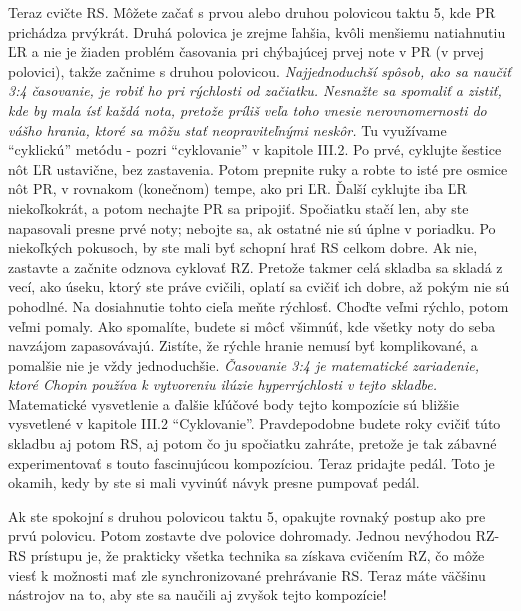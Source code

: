 Teraz cvičte RS. Môžete začať s prvou alebo druhou polovicou taktu 5, kde PR prichádza prvýkrát. Druhá polovica je zrejme ľahšia, kvôli menšiemu natiahnutiu ĽR a nie je žiaden problém časovania pri chýbajúcej prvej note v PR (v prvej polovici), takže začnime s druhou polovicou. \emph{Najjednoduchší spôsob, ako sa naučiť 3:4 časovanie, je robiť ho pri rýchlosti od začiatku. Nesnažte sa spomaliť a zistiť, kde by mala ísť každá nota, pretože príliš veľa toho vnesie nerovnomernosti do vášho hrania, ktoré sa môžu stať neopraviteľnými neskôr.} Tu využívame “cyklickú” metódu - pozri “cyklovanie” v kapitole III.2. Po prvé, cyklujte šestice nôt ĽR ustavične, bez zastavenia. Potom prepnite ruky a robte to isté pre osmice nôt PR, v rovnakom (konečnom) tempe, ako pri ĽR. Ďalší cyklujte iba ĽR niekoľkokrát, a potom nechajte PR sa pripojiť. Spočiatku stačí len, aby ste napasovali presne prvé noty; nebojte sa, ak ostatné nie sú úplne v poriadku. Po niekoľkých pokusoch, by ste mali byť schopní hrať RS celkom dobre. Ak nie, zastavte a začnite odznova cyklovať RZ. Pretože takmer celá skladba sa skladá z vecí, ako úseku, ktorý ste práve cvičili, oplatí sa cvičiť ich dobre, až pokým nie sú pohodlné. Na dosiahnutie tohto cieľa meňte rýchlosť. Choďte veľmi rýchlo, potom veľmi pomaly. Ako spomalíte, budete si môcť všimnúť, kde všetky noty do seba navzájom zapasovávajú. Zistíte, že rýchle hranie nemusí byť komplikované, a pomalšie nie je vždy jednoduchšie. \emph{Časovanie 3:4 je matematické zariadenie, ktoré Chopin používa k vytvoreniu ilúzie hyperrýchlosti v tejto skladbe.} Matematické vysvetlenie a ďalšie kľúčové body tejto kompozície sú bližšie vysvetlené v kapitole III.2 “Cyklovanie”. Pravdepodobne budete roky cvičiť túto skladbu aj potom RS, aj potom čo ju spočiatku zahráte, pretože je tak zábavné experimentovať s touto fascinujúcou kompozíciou. Teraz pridajte pedál. Toto je okamih, kedy by ste si mali vyvinúť návyk presne pumpovať pedál.

Ak ste spokojní s druhou polovicou taktu 5, opakujte rovnaký postup ako pre prvú polovicu. Potom zostavte dve polovice dohromady. Jednou nevýhodou RZ-RS prístupu je, že prakticky všetka technika sa získava cvičením RZ, čo môže viesť k možnosti mať zle synchronizované prehrávanie RS. Teraz máte väčšinu nástrojov na to, aby ste sa naučili aj zvyšok tejto kompozície!

